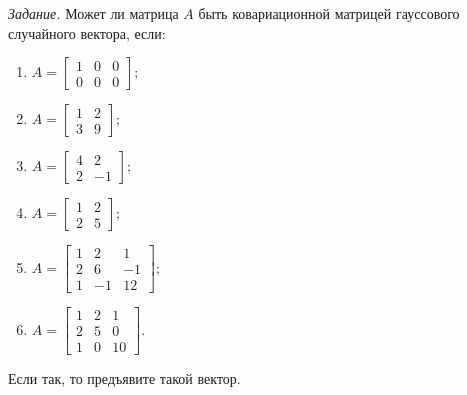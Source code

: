 \textit{Задание.}
Может ли матрица $A$ быть ковариационной матрицей гауссового случайного вектора, если:
\begin{enumerate}[label=\alph*)]
  \item $A =
    \begin{bmatrix}
      1 & 0 & 0 \\
      0 & 0 & 0
    \end{bmatrix};$
  \item $A =
    \begin{bmatrix}
      1 & 2 \\
      3 & 9
    \end{bmatrix};$
  \item $A =
    \begin{bmatrix}
      4 & 2 \\
      2 & -1
    \end{bmatrix};$
  \item $A =
    \begin{bmatrix}
      1 & 2 \\
      2 & 5
    \end{bmatrix};$
  \item $A =
    \begin{bmatrix}
      1 & 2 & 1 \\
      2 & 6 & -1 \\
      1 & -1 & 12
    \end{bmatrix};$
  \item $A =
    \begin{bmatrix}
      1 & 2 & 1 \\
      2 & 5 & 0 \\
      1 & 0 & 10
    \end{bmatrix}.$
\end{enumerate}
Если так, то предъявите такой вектор.

